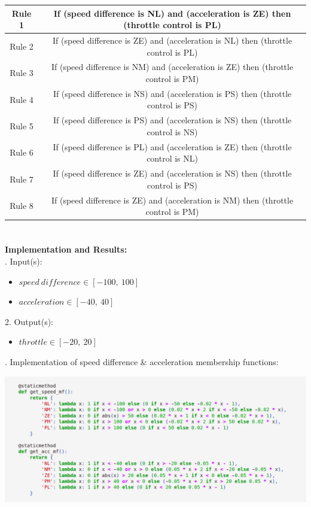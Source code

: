\documentclass[a4paper, 12pt, fleqn]{article}
\begin{document}
\begin{tabular}{| c | c |}
	\hline
	Rule 1  & If (speed difference is NL) and (acceleration is ZE) then (throttle control is PL) \\ 
	\hline
	Rule 2 & If (speed difference is ZE) and (acceleration is NL) then (throttle control is PL) \\ 
	\hline 
	Rule 3 & If (speed difference is NM) and (acceleration is ZE) then (throttle control is PM) \\   
	\hline
	Rule 4 & If (speed difference is NS) and (acceleration is PS) then (throttle control is PS) \\   
	\hline
	Rule 5 & If (speed difference is PS) and (acceleration is NS) then (throttle control is NS) \\   
	\hline
	Rule 6 & If (speed difference is PL) and (acceleration is ZE) then (throttle control is NL) \\   
	\hline
	Rule 7 & If (speed difference is ZE) and (acceleration is NS) then (throttle control is PS) \\   
	\hline
	Rule 8 & If (speed difference is ZE) and (acceleration is NM) then (throttle control is PM) \\   
	\hline
\end{tabular}


\newpage
\section*{}

\textbf{Implementation and Results:} \\

. Input(s):
\begin{itemize}
	\item $speed\ difference \in [-100,\ 100] $
	\item $acceleration \in [-40,\ 40] $
\end{itemize}
2. Output(s):
\begin{itemize}
	\item $throttle \in [-20,\ 20] $
\end{itemize}

\noindent
{}. Implementation of speed difference \& acceleration membership functions:
\begin{center}
	\vspace{0.1cm}
	\includegraphics[scale=0.4]{membership_functions}
\end{center}
\end{document}
